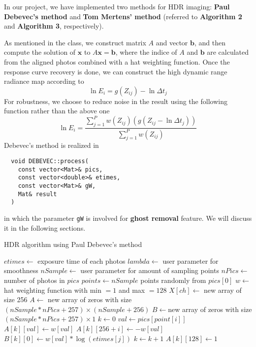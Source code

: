 In our project, we have implemented two methods for HDR imaging: \textbf{Paul Debevec's method} \cite{ref:debevec} and \textbf{Tom Mertens' method} \cite{ref:mertens} (referred to \textbf{Algorithm 2} and \textbf{Algorithm 3}, respectively).

As mentioned in the class, we construct matrix $A$ and vector $\textbf{b}$, and then compute the solution of $\textbf{x}$ to $A\textbf{x}=\textbf{b}$, where the indice of $A$ and $\textbf{b}$ are calculated from the aligned photos combined with a hat weighting function. Once the response curve recovery is done, we can construct the high dynamic range radiance map according to \cite{ref:debevec}
$$\ln E_i=g(Z_{ij})-\ln\Delta t_j$$
For robustness, we choose to reduce noise in the result using the following function rather than the above one
$$\ln E_i=\frac{\sum_{j=1}^P w(Z_{ij})(g(Z_{ij}-\ln\Delta t_j))}{\sum_{j=1}^Pw(Z_{ij})}$$
Debevec's method is realized in 
\begin{lstlisting}
  void DEBEVEC::process(
    const vector<Mat>& pics, 
    const vector<double>& etimes, 
    const vector<Mat>& gW, 
    Mat& result
  )
\end{lstlisting}
in which the parameter \texttt{gW} is involved for \textbf{ghost removal} feature. We will discuss it in the following sections.

\begin{algorithm}
\caption{HDR algorithm using Paul Debevec's method \cite{ref:debevec}}
\begin{algorithmic}[1]
\State $etimes\gets$ exposure time of each photos
\State $lambda\gets$ user parameter for smoothness
\State $nSample\gets$ user parameter for amount of sampling points
\State $nPics\gets$ number of photos in $pics$
\State $points\gets nSample$ points randomly from $pics[0]$
  \State $w\gets$ hat weighting function with min $=1$ and max $=128$
    \State $X[ch]\gets$ new array of size 256
    \State $A\gets$ new array of zeros with size $(nSample*nPics+257)\times(nSample+256)$
    \State $B\gets$new array of zeros with size $(nSample*nPics+257)\times 1$
    \State $k\gets 0$
        \State $val\gets pics[point[i]]$
        \State $A[k][val]\gets w[val]$
        \State $A[k][256+i]\gets-w[val]$
        \State $B[k][0]\gets w[val]*\log(etimes[j])$
        \State $k\gets k+1$
      \EndFor
    \EndFor
    \State $A[k][128]\gets 1$
  \end{algorithmic}
\end{algorithm}

